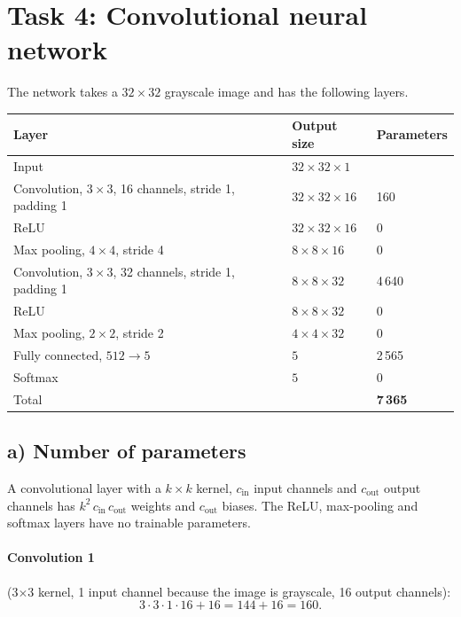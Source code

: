 \documentclass[11pt,a4paper]{article}
\begin{document}
\section{Task 4: Convolutional neural network}

The network takes a $32\times32$ grayscale image and has the following layers.

\begin{center}
\begin{tabular}{lll}
\toprule
Layer & Output size & Parameters \\
\midrule
Input & $32\times32\times1$ & \\
Convolution, $3\times3$, 16 channels, stride 1, padding 1 & $32\times32\times16$ & 160 \\
ReLU & $32\times32\times16$ & 0 \\
Max pooling, $4\times4$, stride 4 & $8\times8\times16$ & 0 \\
Convolution, $3\times3$, 32 channels, stride 1, padding 1 & $8\times8\times32$ & 4\,640 \\
ReLU & $8\times8\times32$ & 0 \\
Max pooling, $2\times2$, stride 2 & $4\times4\times32$ & 0 \\
Fully connected, $512 \to 5$ & $5$ & 2\,565 \\
Softmax & $5$ & 0 \\
\midrule
Total & & \textbf{7\,365} \\
\bottomrule
\end{tabular}
\end{center}

\subsection*{a) Number of parameters}

A convolutional layer with a $k\times k$ kernel, $c_\text{in}$ input channels and $c_\text{out}$ output channels has $k^2\, c_\text{in}\, c_\text{out}$ weights and $c_\text{out}$ biases. The ReLU, max-pooling and softmax layers have no trainable parameters.

\paragraph{Convolution 1} (3$\times$3 kernel, 1 input channel because the image is grayscale, 16 output channels):
\[
    3\cdot 3\cdot 1\cdot 16 + 16 = 144 + 16 = 160 .
\]
\end{document}
